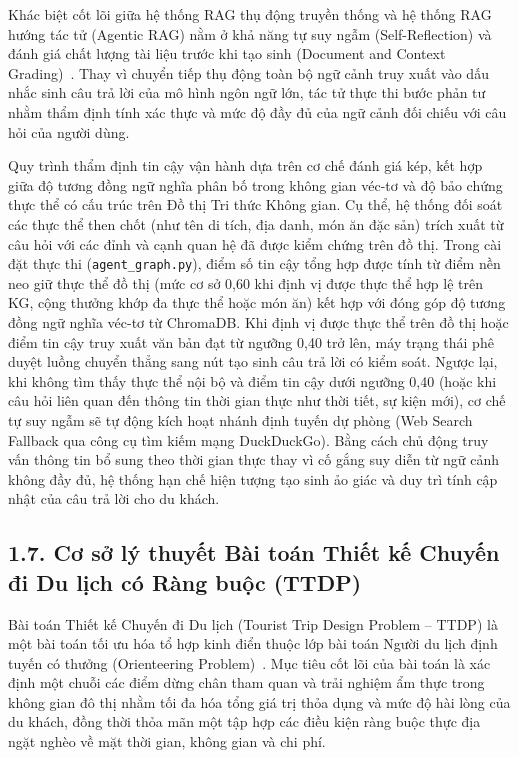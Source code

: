 Khác biệt cốt lõi giữa hệ thống RAG thụ động truyền thống và hệ thống RAG hướng tác tử (Agentic RAG) nằm ở khả năng tự suy ngẫm (Self-Reflection) và đánh giá chất lượng tài liệu trước khi tạo sinh (Document and Context Grading)~\cite{asai2024selfrag, yan2024crag}. Thay vì chuyển tiếp thụ động toàn bộ ngữ cảnh truy xuất vào dấu nhắc sinh câu trả lời của mô hình ngôn ngữ lớn, tác tử thực thi bước phản tư nhằm thẩm định tính xác thực và mức độ đầy đủ của ngữ cảnh đối chiếu với câu hỏi của người dùng.

Quy trình thẩm định tin cậy vận hành dựa trên cơ chế đánh giá kép, kết hợp giữa độ tương đồng ngữ nghĩa phân bố trong không gian véc-tơ và độ bảo chứng thực thể có cấu trúc trên Đồ thị Tri thức Không gian. Cụ thể, hệ thống đối soát các thực thể then chốt (như tên di tích, địa danh, món ăn đặc sản) trích xuất từ câu hỏi với các đỉnh và cạnh quan hệ đã được kiểm chứng trên đồ thị. Trong cài đặt thực thi (\texttt{agent\_graph.py}), điểm số tin cậy tổng hợp được tính từ điểm nền neo giữ thực thể đồ thị (mức cơ sở 0,60 khi định vị được thực thể hợp lệ trên KG, cộng thưởng khớp đa thực thể hoặc món ăn) kết hợp với đóng góp độ tương đồng ngữ nghĩa véc-tơ từ ChromaDB. Khi định vị được thực thể trên đồ thị hoặc điểm tin cậy truy xuất văn bản đạt từ ngưỡng 0,40 trở lên, máy trạng thái phê duyệt luồng chuyển thẳng sang nút tạo sinh câu trả lời có kiểm soát. Ngược lại, khi không tìm thấy thực thể nội bộ và điểm tin cậy dưới ngưỡng 0,40 (hoặc khi câu hỏi liên quan đến thông tin thời gian thực như thời tiết, sự kiện mới), cơ chế tự suy ngẫm sẽ tự động kích hoạt nhánh định tuyến dự phòng (Web Search Fallback qua công cụ tìm kiếm mạng DuckDuckGo). Bằng cách chủ động truy vấn thông tin bổ sung theo thời gian thực thay vì cố gắng suy diễn từ ngữ cảnh không đầy đủ, hệ thống hạn chế hiện tượng tạo sinh ảo giác và duy trì tính cập nhật của câu trả lời cho du khách.

\subsection*{1.7. Cơ sở lý thuyết Bài toán Thiết kế Chuyến đi Du lịch có Ràng buộc (TTDP)}
{}

Bài toán Thiết kế Chuyến đi Du lịch (Tourist Trip Design Problem -- TTDP) là một bài toán tối ưu hóa tổ hợp kinh điển thuộc lớp bài toán Người du lịch định tuyến có thưởng (Orienteering Problem)~\cite{vansteenwegen2011orienteering}. Mục tiêu cốt lõi của bài toán là xác định một chuỗi các điểm dừng chân tham quan và trải nghiệm ẩm thực trong không gian đô thị nhằm tối đa hóa tổng giá trị thỏa dụng và mức độ hài lòng của du khách, đồng thời thỏa mãn một tập hợp các điều kiện ràng buộc thực địa ngặt nghèo về mặt thời gian, không gian và chi phí.

